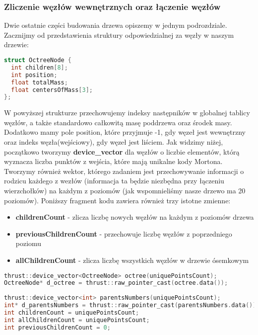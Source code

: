 \documentclass[14pt,twoside,a4paper]{article}
\theoremstyle{definition}
\begin{document}
\subsubsection{\large Zliczenie węzłów wewnętrznych oraz łączenie węzłów}

Dwie ostatnie części budowania drzewa opiszemy w jednym podrozdziale.
Zacznijmy od przedstawienia struktury odpowiedzialnej za węzły w naszym drzewie:

\begin{lstlisting}[language=C++, frame=single, framerule=2pt, caption=Struktura OctreeNode]
struct OctreeNode {
  int children[8];
  int position;
  float totalMass;
  float centersOfMass[3];
};
\end{lstlisting}
W powyższej strukturze przechowujemy indeksy następników w globalnej tablicy węzłów, a także standardowo całkowitą masę poddrzewa oraz środek masy. Dodatkowo mamy pole position, które przyjmuje -1, gdy węzeł jest wewnętrzny oraz indeks węzła(wejściowy), gdy węzeł jest liściem.
Jak widzimy niżej, początkowo tworzymy \textbf{device\_vector} dla węzłów o liczbie elementów, którą wyznacza liczba punktów z wejścia, które mają unikalne kody Mortona. \\
Tworzymy również wektor, którego zadaniem jest przechowywanie informacji o rodzicu każdego z wezłów (informacja ta będzie niezbędna przy łączeniu wierzchołków) na każdym z poziomów (jak wspomnieliśmy nasze drzewo ma 20 poziomów). Poniższy fragment kodu zawiera również trzy istotne zmienne:
\begin{itemize}
\item \textbf{childrenCount} - zlicza liczbę nowych węzłów na każdym z poziomów drzewa
\item \textbf{previousChildrenCount} - przechowuje liczbę węzłów z poprzedniego poziomu
\item \textbf{allChildrenCount} - zlicza liczbę wszystkich węzłów w drzewie ósemkowym
\end{itemize}

\begin{lstlisting}[language=C++, frame=single, framerule=2pt, caption=Przechowywanie węzłów drzewa]
thrust::device_vector<OctreeNode> octree(uniquePointsCount);
OctreeNode* d_octree = thrust::raw_pointer_cast(octree.data());
	
thrust::device_vector<int> parentsNumbers(uniquePointsCount);
int* d_parentsNumbers = thrust::raw_pointer_cast(parentsNumbers.data());
int childrenCount = uniquePointsCount;
int allChildrenCount = uniquePointsCount;
int previousChildrenCount = 0;
\end{lstlisting}
\end{document}
